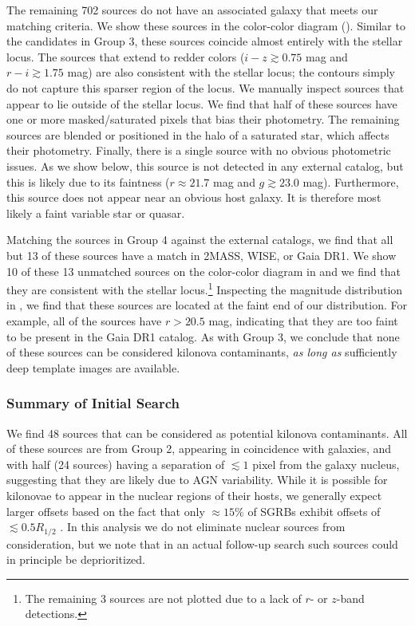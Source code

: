The remaining 702 sources do not have an associated galaxy that meets our matching criteria. We show these sources in the color-color diagram (). Similar to the candidates in Group 3, these sources coincide almost entirely with the stellar locus. The sources that extend to redder colors ($i-z \gtrsim 0.75$ mag and $r-i \gtrsim 1.75$ mag) are also consistent with the stellar locus; the contours simply do not capture this sparser region of the locus. We manually inspect sources that appear to lie outside of the stellar locus. We find that half of these sources have one or more masked/saturated pixels that bias their photometry. The remaining sources are blended or positioned in the halo of a saturated star, which affects their photometry. Finally, there is a single source with no obvious photometric issues. As we show below, this source is not detected in any external catalog, but this is likely due to its faintness ($r \approx 21.7$ mag and $g \gtrsim 23.0$ mag). Furthermore, this source does not appear near an obvious host galaxy. It is therefore most likely a faint variable star or quasar.

Matching the sources in Group 4 against the external catalogs, we find that all but 13 of these sources have a match in 2MASS, WISE, or Gaia DR1. We show 10 of these 13 unmatched sources on the color-color diagram in  and we find that they are consistent with the stellar locus.\footnote{The remaining 3 sources are not plotted due to a lack of $r$- or $z$-band detections.} Inspecting the magnitude distribution in , we find that these sources are located at the faint end of our distribution. For example, all of the sources have $r > 20.5$ mag, indicating that they are too faint to be present in the Gaia DR1 catalog. As with Group 3, we conclude that none of these sources can be considered kilonova contaminants, {\it as long as} sufficiently deep template images are available.

\subsubsection{Summary of Initial Search}
\label{sec:ch3_search_summary}
We find 48 sources that can be considered as potential kilonova contaminants. All of these sources are from Group 2, appearing in coincidence with galaxies, and with half (24 sources) having a separation of $\lesssim 1$ pixel from the galaxy nucleus, suggesting that they are likely due to AGN variability. While it is possible for kilonovae to appear in the nuclear regions of their hosts, we generally expect larger offsets based on the fact that only $\approx 15\%$ of SGRBs exhibit offsets of $\lesssim 0.5 R_{1/2}$ \citep{FongBerger13,Fong+13,Berger2014}. In this analysis we do not eliminate nuclear sources from consideration, but we note that in an actual follow-up search such sources could in principle be deprioritized.


